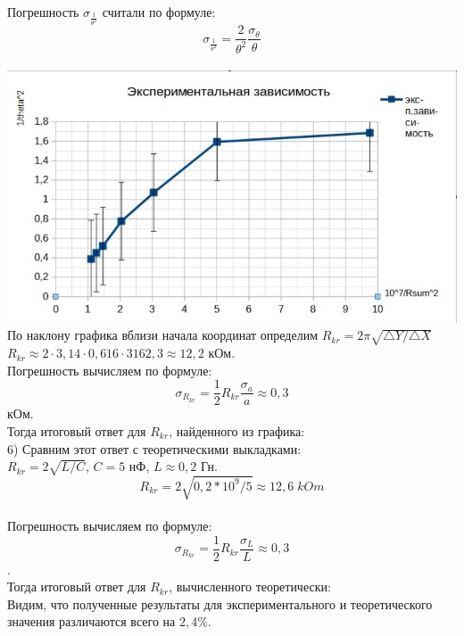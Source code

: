 \documentclass[11pt]{article}
\begin{document}
Погрешность $\sigma_{\frac{1}{\theta^2}}$ считали по формуле:\\
$$ \sigma_{\frac{1}{\theta^2}} = \frac{2}{\theta^2}\frac{\sigma_{\theta}}{\theta}$$\\
\includegraphics[width=15cm]{g6}\\
По наклону графика вблизи начала координат определим $R_{kr} = 2\pi\sqrt{\triangle Y / \triangle X}$\\
$R_{kr} \approx 2\cdot 3,14 \cdot 0,616 \cdot 3162,3 \approx 12,2$ кОм.\\
Погрешность вычисляем по формуле:\\
$$\sigma_{R_{kr}} = \frac{1}{2}R_{kr}\frac{\sigma_{a}}{a} \approx 0,3$$ кОм.\\
Тогда итоговый ответ для $R_{kr}$, найденного из графика: \\
6) Сравним этот ответ с теоретическими выкладками:\\
$R_{kr} = 2\sqrt{L/C}$, $C = 5$ нФ, $L \approx 0,2$ Гн.\\
$$R_{kr} = 2\sqrt{0,2*10^9/5} \approx 12,6 \; kOm$$\\
Погрешность вычисляем по формуле:\\
$$\sigma_{R_{kr}} = \frac{1}{2}R_{kr}\frac{\sigma_{L}}{L} \approx 0,3$$.\\
Тогда итоговый ответ для $R_{kr}$, вычисленного теоретически: \\
Видим, что полученные результаты для экспериментального и теоретического значения различаются всего на $2,4\%$.\\
\end{document}
